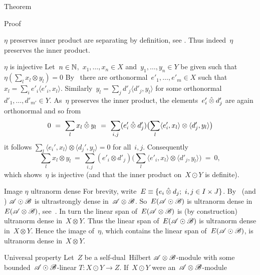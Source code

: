 \begin{parsec}
\begin{point}{Theorem}
\begin{point}{Proof}
\begin{point}{$\eta$ preserves inner product}
    are separating by definition, see .
Thus indeed~$\eta$ preserves the inner product.
\end{point}
\begin{point}{$\eta$ is injective}%
Let~$n \in \mathbb{N}$,~$x_1, \ldots, x_n \in X$
    and~$y_1,\ldots, y_n \in Y$
    be given such that~$\eta(\sum_l x_l \otimes y_l) = 0$
By~
    there are orthonormal~$e'_1,\ldots, e'_m \in X$
    such that~$x_l = \sum_i e'_i \langle e'_i, x_l\rangle$.
Similarly~$y_l = \sum_j d'_j \langle d'_j, y_l\rangle$
for some orthonormal~$d'_1, \ldots, d'_{m'} \in Y$.
As~$\eta$ preserves the inner product,
    the elements~$e_i'\mathbin{\hat{\otimes}} d_j'$ are again orthonormal
    and so from
\begin{equation*}
    0 \ =\  \sum_l x_l \mathbin{\hat{\otimes}} y_l
    \ =\  \sum_{i,j} (e'_i \mathbin{\hat{\otimes}} d'_j) \bigl(\sum_l
         \langle e'_i, x_l\rangle \otimes \langle d'_j, y_l\rangle\bigr)
\end{equation*}
         it follows
         $\sum_l \langle e_i',x_l\rangle \otimes \langle d_j',y_l\rangle = 0$
         for all~$i,j$.
Consequently
\begin{equation*}
    \sum_l x_l \otimes y_l
        \ =\  \sum_{i,j} (e'_i \otimes d'_j) \bigl(\sum_l
        \langle e'_i, x_l \rangle \otimes \langle d'_j, y_l \rangle 
        \bigr) \ = \ 0,
\end{equation*}
which shows~$\eta$ is injective
    (and that the inner product on~$X \odot Y$ is definite).
\end{point}
\begin{point}{Image $\eta$ ultranorm dense}%
For brevity, write~$E \equiv \{ e_i \mathbin{\hat{\otimes}} d_j; \ i,j \in I\times J\}$.
By~ (and )
    $\mathscr{A} \odot \mathscr{B}$ is ultrastrongly dense in~$\mathscr{A} \otimes \mathscr{B}$.
So~$E (\mathscr{A} \odot \mathscr{B})$
    is ultranorm dense in~$E (\mathscr{A} \otimes \mathscr{B})$,
    see~.
In turn the linear span of~$E (\mathscr{A} \otimes \mathscr{B})$
    is (by construction) ultranorm dense in~$X \otimes Y$.
Thus the linear span of~$E (\mathscr{A} \odot \mathscr{B})$
    is ultranorm dense in~$X \otimes Y$.
Hence the image of~$\eta$,
    which contains the linear span of~$E (\mathscr{A} \odot \mathscr{B})$,
    is ultranorm dense in~$X \otimes Y$.
\end{point}
\begin{point}{Universal property}%
Let~$Z$ be a self-dual~Hilbert $\mathscr{A} \otimes \mathscr{B}$-module
 with some bounded~$\mathscr{A} \odot \mathscr{B}$-linear $T\colon X \odot Y \to Z$.
If~$X \odot Y$ were an~$\mathscr{A} \otimes \mathscr{B}$-module

\end{point}
\end{point}
\end{point}
\end{parsec}
